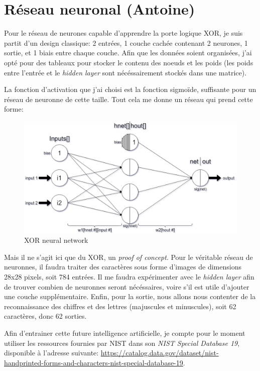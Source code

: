 \documentclass[12pt]{report}
\begin{document}
\section{Réseau neuronal (Antoine)}

Pour le réseau de neurones capable d'apprendre la porte logique XOR, je suis partit d'un design classique: 2 entrées, 1 couche cachée contenant 2 neurones, 1 sortie, et 1 biais entre chaque couche. Afin que les données soient organisées, j'ai opté pour des tableaux pour stocker le contenu des noeuds et les poids (les poids entre l'entrée et le \textit{hidden layer} sont nécéssairement stockés dans une matrice). 

La fonction d'activation que j'ai choisi est la fonction sigmoïde, suffisante pour un réseau de neuronne de cette taille. Tout cela me donne un réseau qui prend cette forme:

\begin{figure}[H]
    \centering
    \includegraphics[width=1\textwidth]{XOR_Neural_Network}
    \caption{XOR neural network}
\end{figure}

Mais il ne s'agit ici que du XOR, un \textit{proof of concept}. Pour le véritable réseau de neuronnes, il faudra traiter des caractères sous forme d'images de dimensions 28x28 pixels, soit 784 entrées. Il me faudra expérimenter avec le \textit{hidden layer} afin de trouver combien de neuronnes seront nécéssaires, voire s'il est utile d'ajouter une couche supplémentaire. Enfin, pour la sortie, nous allons nous contenter de la reconnaissance des chiffres et des lettres (majuscules et minuscules), soit 62 caractères, donc 62 sorties.

Afin d'entrainer cette future intelligence artificielle, je compte pour le moment utiliser les ressources fournies par NIST dans son \textit{NIST Special Database 19}, disponible à l'adresse suivante: \url{https://catalog.data.gov/dataset/nist-handprinted-forms-and-characters-nist-special-database-19}. 
\end{document}

